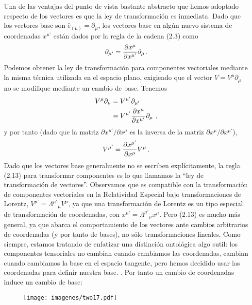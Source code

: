 \documentclass[11pt,b5paper,openany,twoside]{book}
\newcommand{\e}[1]{\hat{e}_{(#1)}}
\newcommand{\p}[1]{{\partial_{#1}}}
\begin{document}
Una de las ventajas del punto de vista bastante abstracto que hemos adoptado respecto de los vectores es que la ley de transformación es inmediata.
Dado que los vectores base son $\e\mu=\p\mu$, los vectores base en algún nuevo sistema de coordenadas $x^{\mu'}$ están dados por la regla de la cadena (2.3) como
\begin{equation}
\p{\mu'} = {{\partial x^\mu}\over{\partial x^{\mu'}}}\p\mu\,.
\label{2.11}
\end{equation}
Podemos obtener la ley de transformación para componentes vectoriales mediante la misma técnica utilizada en el espacio plano, exigiendo que el vector $V=V^\mu\p\mu$ no se modifique mediante un cambio de base.
Tenemos
\begin{align}
V^\mu\p\mu &=  V^{\mu'}\p{\mu'}\nonumber \\
&=  V^{\mu'}{{\partial x^\mu}\over{\partial x^{\mu'}}}\p\mu\ ,
\label{2.12}
\end{align}
y por tanto (dado que la matriz $\partial x^{\mu'}/\partial x^\mu$ es la inversa de la matriz $\partial x^{\mu}/\partial x^{\mu'}$),
\begin{equation}
V^{\mu'} = {{\partial x^{\mu'}}\over{\partial x^{\mu}}}V^\mu
\,.\label{2.13}
\end{equation}
Dado que los vectores base generalmente no se escriben explícitamente, la regla (2.13) para transformar componentes es lo que llamamos la ``ley de transformación de vectores''. Observamos que es compatible con la transformación de componentes vectoriales en la Relatividad Especial bajo transformaciones de Lorentz, $V^{\mu'} = \Lambda^{\mu'}{}_\mu V^\mu$, ya que una transformación de Lorentz es un tipo especial de transformación de coordenadas, con $x^{\mu'} = \Lambda^{\mu'}{}_\mu x^\mu$.
Pero (2.13) es mucho más general, ya que abarca el comportamiento de los vectores ante cambios arbitrarios de coordenadas (y por tanto de bases), no sólo transformaciones lineales.
Como siempre, estamos tratando de enfatizar una distinción ontológica algo sutil: los componentes tensoriales no cambian cuando cambiamos las coordenadas, cambian cuando cambiamos la base en el espacio tangente, pero hemos decidido usar las coordenadas para definir nuestra base. .
Por tanto un cambio de coordenadas induce un cambio de base:

\begin{figure}[h]
\centering
\texttt{[image: imagenes/two17.pdf]}
\end{figure}
\end{document}
